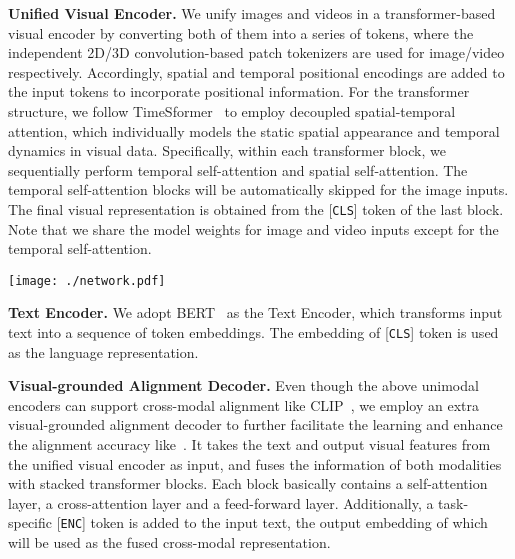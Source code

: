 \documentclass{article}
\makeatletter
\newcommand*{\system}{OmniVL\@\xspace}
\makeatother
\begin{document}
\noindent \textbf{Unified Visual Encoder.} We unify images and videos in a transformer-based visual encoder by converting both of them into a series of tokens, where the independent 2D/3D convolution-based patch tokenizers are used for image/video respectively. Accordingly, spatial and temporal positional encodings are added to the input tokens to incorporate positional information. For the transformer structure, we follow TimeSformer~\cite{gberta_2021_ICML} to employ decoupled spatial-temporal attention, which individually models the static spatial appearance and temporal dynamics in visual data. Specifically, within each transformer block, we sequentially perform temporal self-attention and spatial self-attention. The temporal self-attention blocks will be automatically skipped for the image inputs. The final visual representation  is obtained from the [\texttt{CLS}] token of the last block. Note that we share the model weights for image and video inputs except for the temporal self-attention. 

\begin{figure*}[t]
  \centering
  \texttt{[image: ./network.pdf]}
\caption{An overview of \system. We unify the pretraining corpus (human-annotated data and webly-crawled data), modality (image, video, and language), and functionality (multi-modal understanding and generation tasks, visual classification tasks) in one universal framework.}
  \label{fig:networks}
\end{figure*}

\noindent \textbf{Text Encoder.} We adopt BERT~\cite{devlin2018bert} as the Text Encoder, which transforms input text into a sequence of token embeddings. The embedding of [\texttt{CLS}] token  is used as the language representation.

\noindent \textbf{Visual-grounded Alignment Decoder.} Even though the above unimodal encoders can support cross-modal alignment like CLIP~\cite{radford2021learning}, we employ an extra visual-grounded alignment decoder to further facilitate the learning and enhance the alignment accuracy like~\cite{li2022blip,fu2021violet}. It takes the text and output visual features from the unified visual encoder as input, and fuses the information of both modalities with stacked transformer blocks. Each block basically contains a self-attention layer, a cross-attention layer and a feed-forward layer. Additionally, a task-specific [\texttt{ENC}] token is added to the input text, the output embedding of which will be used as the fused cross-modal representation.
\end{document}

